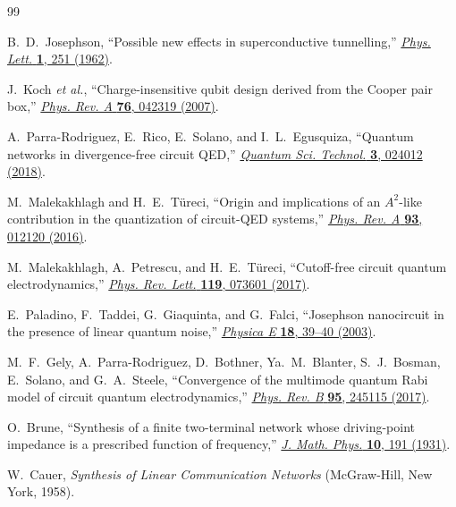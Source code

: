 \documentclass[reprint, floatfix, superscriptaddress, amsmath, amssymb, longbibliography]{revtex4-2}
\begin{document}
\begin{thebibliography}{99}

B.~D.~Josephson, ``Possible new effects in superconductive tunnelling,'' 
\href{https://doi.org/10.1016/0031-9163(62)91369-0}{\textit{Phys. Lett.} \textbf{1}, 251 (1962)}.

J.~Koch \textit{et al.}, ``Charge-insensitive qubit design derived from the Cooper pair box,'' 
\href{https://doi.org/10.1103/PhysRevA.76.042319}{\textit{Phys. Rev. A} \textbf{76}, 042319 (2007)}.

A.~Parra-Rodriguez, E.~Rico, E.~Solano, and I.~L.~Egusquiza, ``Quantum networks in divergence-free circuit QED,'' 
\href{https://doi.org/10.1088/2058-9565/aab1ba}{\textit{Quantum Sci. Technol.} \textbf{3}, 024012 (2018)}.

M.~Malekakhlagh and H.~E.~T\"{u}reci, ``Origin and implications of an $A^2$-like contribution in the quantization of circuit-QED systems,''
\href{https://doi.org/10.1103/PhysRevA.93.012120}{\textit{Phys. Rev. A} \textbf{93}, 012120 (2016)}.

M.~Malekakhlagh, A.~Petrescu, and H.~E.~T\"{u}reci, ``Cutoff-free circuit quantum electrodynamics,''
\href{https://doi.org/10.1103/PhysRevLett.119.073601}{\textit{Phys. Rev. Lett.} \textbf{119}, 073601 (2017)}.

E.~Paladino, F.~Taddei, G.~Giaquinta, and G.~Falci,
``Josephson nanocircuit in the presence of linear quantum noise,''
\href{https://doi.org/10.1016/S1386-9477(02)00948-7}{\textit{Physica E} \textbf{18}, 39--40 (2003)}.

M.~F.~Gely, A.~Parra-Rodriguez, D.~Bothner, Ya.~M.~Blanter,
S.~J.~Bosman, E.~Solano, and G.~A.~Steele,
``Convergence of the multimode quantum Rabi model of circuit quantum electrodynamics,''
\href{https://doi.org/10.1103/PhysRevB.95.245115}{\textit{Phys. Rev. B} \textbf{95}, 245115 (2017)}.

O.~Brune, ``Synthesis of a finite two-terminal network whose driving-point impedance is a prescribed function of frequency,'' 
\href{https://doi.org/10.1002/sapm193110191}{\textit{J. Math. Phys.} \textbf{10}, 191 (1931)}.

W.~Cauer,
\textit{Synthesis of Linear Communication Networks}
(McGraw-Hill, New York, 1958).


\end{thebibliography}
\end{document}
